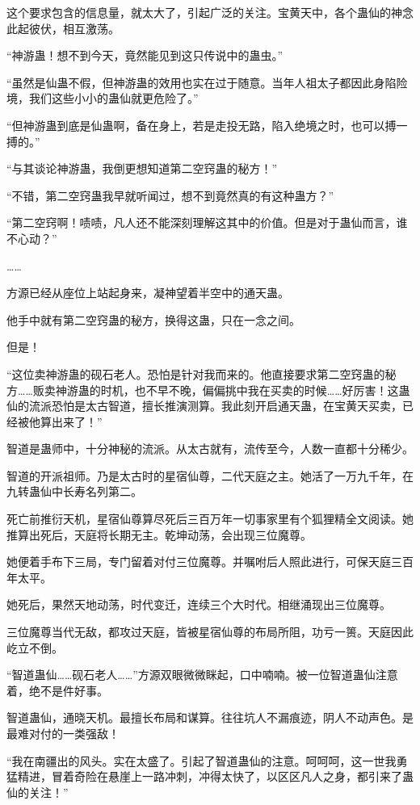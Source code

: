 \begin{this_body}
这个要求包含的信息量，就太大了，引起广泛的关注。宝黄天中，各个蛊仙的神念此起彼伏，相互激荡。

“神游蛊！想不到今天，竟然能见到这只传说中的蛊虫。”

“虽然是仙蛊不假，但神游蛊的效用也实在过于随意。当年人祖太子都因此身陷险境，我们这些小小的蛊仙就更危险了。”

“但神游蛊到底是仙蛊啊，备在身上，若是走投无路，陷入绝境之时，也可以搏一搏的。”

“与其谈论神游蛊，我倒更想知道第二空窍蛊的秘方！”

“不错，第二空窍蛊我早就听闻过，想不到竟然真的有这种蛊方？”

“第二空窍啊！啧啧，凡人还不能深刻理解这其中的价值。但是对于蛊仙而言，谁不心动？”

……

方源已经从座位上站起身来，凝神望着半空中的通天蛊。

他手中就有第二空窍蛊的秘方，换得这蛊，只在一念之间。

但是！

“这位卖神游蛊的砚石老人。恐怕是针对我而来的。他直接要求第二空窍蛊的秘方……贩卖神游蛊的时机，也不早不晚，偏偏挑中我在买卖的时候……好厉害！这蛊仙的流派恐怕是太古智道，擅长推演测算。我此刻开启通天蛊，在宝黄天买卖，已经被他算出来了！”

智道是蛊师中，十分神秘的流派。从太古就有，流传至今，人数一直都十分稀少。

智道的开派祖师。乃是太古时的星宿仙尊，二代天庭之主。她活了一万九千年，在九转蛊仙中长寿名列第二。

死亡前推衍天机，星宿仙尊算尽死后三百万年一切事家里有个狐狸精全文阅读。她推算出死后，天庭将长期无主。乾坤动荡，会出现三位魔尊。

她便着手布下三局，专门留着对付三位魔尊。并嘱咐后人照此进行，可保天庭三百年太平。

她死后，果然天地动荡，时代变迁，连续三个大时代。相继涌现出三位魔尊。

三位魔尊当代无敌，都攻过天庭，皆被星宿仙尊的布局所阻，功亏一篑。天庭因此屹立不倒。

“智道蛊仙……砚石老人……”方源双眼微微眯起，口中喃喃。被一位智道蛊仙注意着，绝不是件好事。

智道蛊仙，通晓天机。最擅长布局和谋算。往往坑人不漏痕迹，阴人不动声色。是最难对付的一类强敌！

“我在南疆出的风头。实在太盛了。引起了智道蛊仙的注意。呵呵呵，这一世我勇猛精进，冒着奇险在悬崖上一路冲刺，冲得太快了，以区区凡人之身，都引来了蛊仙的关注！”


\end{this_body}
